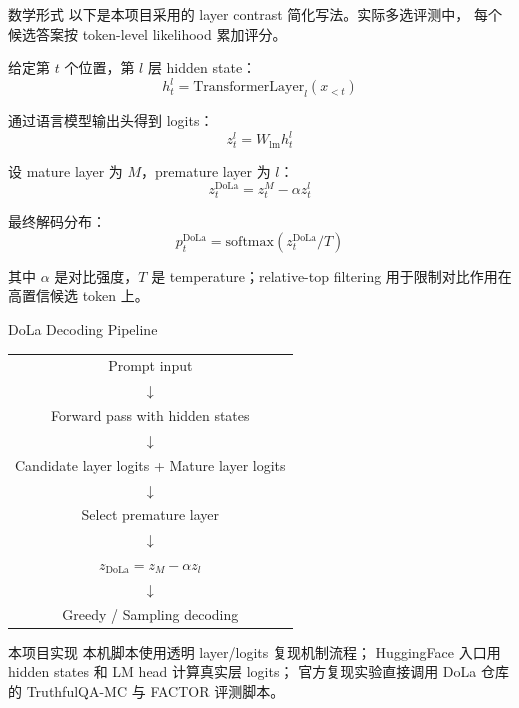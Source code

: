 \documentclass[aspectratio=169,11pt]{ctexbeamer}
\begin{document}
\begin{frame}{数学形式}
  \small
  以下是本项目采用的 layer contrast 简化写法。实际多选评测中，
  每个候选答案按 token-level likelihood 累加评分。

  \vspace{0.3em}
  给定第 $t$ 个位置，第 $l$ 层 hidden state：
  \[
    h_t^l = \mathrm{TransformerLayer}_l(x_{<t})
  \]

  通过语言模型输出头得到 logits：
  \[
    z_t^l = W_{\mathrm{lm}} h_t^l
  \]

  设 mature layer 为 $M$，premature layer 为 $l$：
  \[
    z_t^{\mathrm{DoLa}} = z_t^M - \alpha z_t^l
  \]

  最终解码分布：
  \[
    p_t^{\mathrm{DoLa}} = \mathrm{softmax}(z_t^{\mathrm{DoLa}} / T)
  \]

  \vspace{0.3em}
  其中 $\alpha$ 是对比强度，$T$ 是 temperature；relative-top filtering 用于限制对比作用在高置信候选 token 上。
\end{frame}

\begin{frame}{DoLa Decoding Pipeline}
  \small
  \begin{center}
  \begin{tabular}{c}
    Prompt input \\
    $\downarrow$ \\
    Forward pass with hidden states \\
    $\downarrow$ \\
    Candidate layer logits \quad + \quad Mature layer logits \\
    $\downarrow$ \\
    Select premature layer \\
    $\downarrow$ \\
    $z_{\mathrm{DoLa}} = z_M - \alpha z_l$ \\
    $\downarrow$ \\
    Greedy / Sampling decoding
  \end{tabular}
  \end{center}

  \vspace{0.2em}
  \begin{block}{本项目实现}
    本机脚本使用透明 layer/logits 复现机制流程；
    HuggingFace 入口用 hidden states 和 LM head 计算真实层 logits；
    官方复现实验直接调用 DoLa 仓库的 TruthfulQA-MC 与 FACTOR 评测脚本。
  \end{block}
\end{frame}
\end{document}

